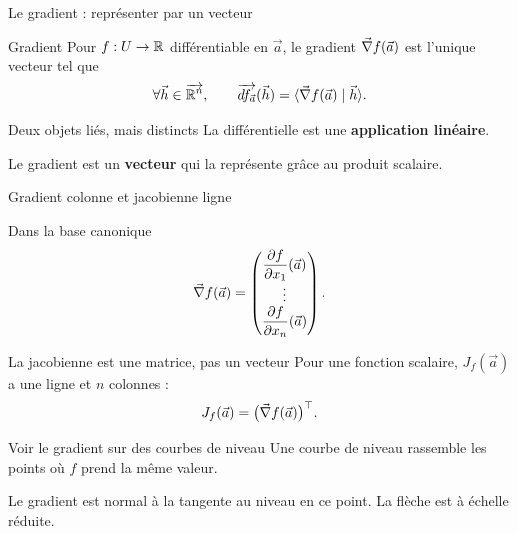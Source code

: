 \begin{frame}[t]{Le gradient : représenter par un vecteur}
\coursanalyse
\begin{notion}{Gradient}
Pour $f:U\to\mathbb R$ différentiable en $\vec a$, le gradient $\vec\nabla f(\vec a)$ est l'unique vecteur tel que
\[\forall\vec h\in\overrightarrow{\mathbb R^{n}},\qquad\overrightarrow{df_{\vec a}}(\vec h)=\langle \vec\nabla f(\vec a)\mid \vec h\rangle.\]
\end{notion}
\begin{resultat}{Deux objets liés, mais distincts}
La différentielle est une \textbf{application linéaire}.

\medskip
Le gradient est un \textbf{vecteur} qui la représente grâce au produit scalaire.
\end{resultat}
\end{frame}

\begin{frame}[t]{Gradient colonne et jacobienne ligne}
\coursanalyse
\begin{notion}{Dans la base canonique}
\[\vec\nabla f(\vec a)=\begin{pmatrix}\dfrac{\partial f}{\partial x_1}(\vec a)\\\vdots\\\dfrac{\partial f}{\partial x_n}(\vec a)\end{pmatrix}.\]
\end{notion}
\begin{resultat}{La jacobienne est une matrice, pas un vecteur}
Pour une fonction scalaire, $J_f(\vec a)$ a une ligne et $n$ colonnes :
\[J_f(\vec a)=\bigl(\vec\nabla f(\vec a)\bigr)^\top.\]
\end{resultat}
\end{frame}

\begin{frame}[t]{Voir le gradient sur des courbes de niveau}
\coursanalyse
Une courbe de niveau rassemble les points où $f$ prend la même valeur.
\begin{center}\end{center}
\vfill Le gradient est normal à la tangente au niveau en ce point. La flèche est à échelle réduite.
\end{frame}

